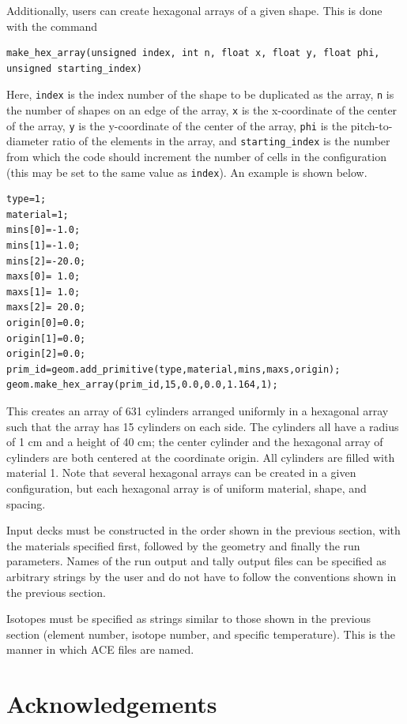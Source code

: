 \documentclass[twoside,a4paper]{refart}
\begin{document}
Additionally, users can create hexagonal arrays of a given shape. This is done with the command

\begin{Verbatim}
make_hex_array(unsigned index, int n, float x, float y, float phi, 
unsigned starting_index)
\end{Verbatim}

Here, \texttt{index} is the index number of the shape to be duplicated as the array, \texttt{n} is the 
number of shapes on an edge of the array, \texttt{x} is the x-coordinate of the center of the array,
\texttt{y} is the y-coordinate of the center of the array, \texttt{phi} is the pitch-to-diameter ratio 
of the elements in the array, and \texttt{starting\_index} is the number from which the code should 
increment the number of cells in the configuration (this may be set to the same value as \texttt{index}). 
An example is shown below.

\begin{verbatim}
type=1;
material=1;
mins[0]=-1.0;
mins[1]=-1.0;
mins[2]=-20.0;
maxs[0]= 1.0;
maxs[1]= 1.0;
maxs[2]= 20.0;
origin[0]=0.0;
origin[1]=0.0;
origin[2]=0.0;
prim_id=geom.add_primitive(type,material,mins,maxs,origin);
geom.make_hex_array(prim_id,15,0.0,0.0,1.164,1); 
\end{verbatim}

This creates an array of 631 cylinders arranged uniformly in a hexagonal array such that the array has 15
cylinders on each side. The cylinders all have a radius of 1 cm and a height of 40 cm; the center cylinder
and the hexagonal array of cylinders are both centered at the coordinate origin. All cylinders are filled
with material 1. Note that several hexagonal arrays can be created in a given configuration, but each 
hexagonal array is of uniform material, shape, and spacing.

Input decks must be constructed in the order shown in the previous section, with the materials specified first, followed by the geometry and finally the run parameters. Names of the run output and tally output
files can be specified as arbitrary strings by the user and do not have to follow the conventions shown 
in the previous section.

Isotopes must be specified as strings similar to those shown in the previous section (element number,
isotope number, and specific temperature). This is the manner in which ACE files are named.

\newpage
\section*{Acknowledgements}
\label{sec:ack}
\end{document}
